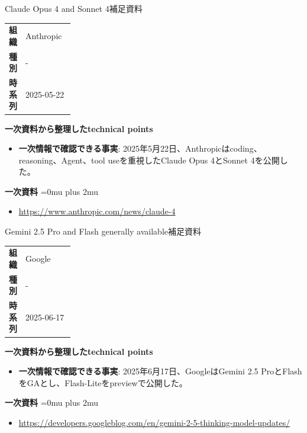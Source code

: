 \begin{technicalnote}{Claude Opus 4 and Sonnet 4}{補足資料}
\begingroup
\begin{tabularx}{\linewidth}{@{}>{\bfseries}p{0.22\linewidth}X@{}}
組織 & Anthropic \\
種別 & - \\
時系列 & 2025-05-22 \\
\end{tabularx}
\smallskip
{\bfseries 一次資料から整理したtechnical points}
\begin{itemize}[leftmargin=1.5em,itemsep=0.35em]
\item \textbf{一次情報で確認できる事実}: 2025年5月22日、Anthropicはcoding、reasoning、Agent、tool useを重視したClaude Opus 4とSonnet 4を公開した。
\end{itemize}
\begin{samepage}
{\bfseries 一次資料}
\begingroup\sloppy
\Urlmuskip=0mu plus 2mu\relax
\begin{itemize}[leftmargin=1.5em,itemsep=0.25em]
\item {\scriptsize\url{https://www.anthropic.com/news/claude-4}}
\end{itemize}
\endgroup
\end{samepage}
\endgroup
\end{technicalnote}
\medskip

\begin{technicalnote}{Gemini 2.5 Pro and Flash generally available}{補足資料}
\begingroup
\begin{tabularx}{\linewidth}{@{}>{\bfseries}p{0.22\linewidth}X@{}}
組織 & Google \\
種別 & - \\
時系列 & 2025-06-17 \\
\end{tabularx}
\smallskip
{\bfseries 一次資料から整理したtechnical points}
\begin{itemize}[leftmargin=1.5em,itemsep=0.35em]
\item \textbf{一次情報で確認できる事実}: 2025年6月17日、GoogleはGemini 2.5 ProとFlashをGAとし、Flash-Liteをpreviewで公開した。
\end{itemize}
\begin{samepage}
{\bfseries 一次資料}
\begingroup\sloppy
\Urlmuskip=0mu plus 2mu\relax
\begin{itemize}[leftmargin=1.5em,itemsep=0.25em]
\item {\scriptsize\url{https://developers.googleblog.com/en/gemini-2-5-thinking-model-updates/}}
\end{itemize}
\endgroup
\end{samepage}
\endgroup
\end{technicalnote}
\medskip
